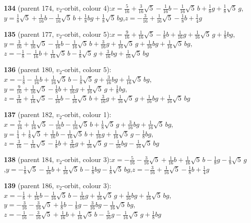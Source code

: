 \documentclass[10pt]{article}
\begin{document}
{\noindent\textbf{134} (parent 174, $v_2$-orbit, colour 4):\quad $x=\tfrac{5}{16}+\tfrac{3}{16}\sqrt5-\tfrac{1}{16}b-\tfrac{1}{16}\sqrt5\,b+\tfrac{1}{8}g+\tfrac{1}{8}\sqrt5\,g$,\quad $y=\tfrac{1}{8}\sqrt5+\tfrac{1}{16}b-\tfrac{1}{16}\sqrt5\,b+\tfrac{1}{8}bg+\tfrac{1}{8}\sqrt5\,bg$,\quad $z=-\tfrac{3}{16}+\tfrac{1}{16}\sqrt5-\tfrac{1}{8}b+\tfrac{1}{4}g$\par\smallskip
\noindent\textbf{135} (parent 177, $v_2$-orbit, colour 5):\quad $x=\tfrac{9}{16}+\tfrac{1}{16}\sqrt5-\tfrac{1}{8}b+\tfrac{1}{16}g+\tfrac{1}{16}\sqrt5\,g+\tfrac{1}{8}bg$,\quad $y=\tfrac{3}{16}+\tfrac{1}{16}\sqrt5-\tfrac{1}{16}b-\tfrac{1}{16}\sqrt5\,b+\tfrac{3}{16}g+\tfrac{1}{16}\sqrt5\,g+\tfrac{1}{16}bg+\tfrac{1}{16}\sqrt5\,bg$,\quad $z=-\tfrac{1}{8}-\tfrac{1}{16}b+\tfrac{1}{16}\sqrt5\,b-\tfrac{1}{8}\sqrt5\,g+\tfrac{3}{16}bg+\tfrac{1}{16}\sqrt5\,bg$\par\smallskip
\noindent\textbf{136} (parent 180, $v_2$-orbit, colour 5):\quad $x=-\tfrac{1}{8}-\tfrac{1}{16}b+\tfrac{1}{16}\sqrt5\,b-\tfrac{1}{8}\sqrt5\,g+\tfrac{3}{16}bg+\tfrac{1}{16}\sqrt5\,bg$,\quad $y=\tfrac{9}{16}+\tfrac{1}{16}\sqrt5-\tfrac{1}{8}b+\tfrac{1}{16}g+\tfrac{1}{16}\sqrt5\,g+\tfrac{1}{8}bg$,\quad $z=\tfrac{3}{16}+\tfrac{1}{16}\sqrt5-\tfrac{1}{16}b-\tfrac{1}{16}\sqrt5\,b+\tfrac{3}{16}g+\tfrac{1}{16}\sqrt5\,g+\tfrac{1}{16}bg+\tfrac{1}{16}\sqrt5\,bg$\par\smallskip
\noindent\textbf{137} (parent 182, $v_2$-orbit, colour 1):\quad $x=\tfrac{7}{16}+\tfrac{1}{16}\sqrt5-\tfrac{1}{16}b-\tfrac{1}{16}\sqrt5\,b+\tfrac{1}{8}\sqrt5\,g+\tfrac{3}{16}bg+\tfrac{1}{16}\sqrt5\,bg$,\quad $y=\tfrac{1}{4}+\tfrac{1}{8}\sqrt5+\tfrac{1}{16}b-\tfrac{1}{16}\sqrt5\,b+\tfrac{1}{16}g+\tfrac{1}{16}\sqrt5\,g-\tfrac{1}{8}bg$,\quad $z=\tfrac{3}{16}-\tfrac{1}{16}\sqrt5-\tfrac{1}{8}b+\tfrac{3}{16}g+\tfrac{1}{16}\sqrt5\,g-\tfrac{1}{16}bg-\tfrac{1}{16}\sqrt5\,bg$\par\smallskip
\noindent\textbf{138} (parent 184, $v_2$-orbit, colour 3):\quad $x=-\tfrac{5}{16}-\tfrac{3}{16}\sqrt5+\tfrac{1}{16}b+\tfrac{1}{16}\sqrt5\,b-\tfrac{1}{8}g-\tfrac{1}{8}\sqrt5\,g$,\quad $y=-\tfrac{1}{8}\sqrt5-\tfrac{1}{16}b+\tfrac{1}{16}\sqrt5\,b-\tfrac{1}{8}bg-\tfrac{1}{8}\sqrt5\,bg$,\quad $z=-\tfrac{3}{16}+\tfrac{1}{16}\sqrt5-\tfrac{1}{8}b+\tfrac{1}{4}g$\par\smallskip
\noindent\textbf{139} (parent 186, $v_2$-orbit, colour 3):\quad $x=-\tfrac{1}{8}+\tfrac{1}{16}b-\tfrac{1}{16}\sqrt5\,b-\tfrac{1}{16}g+\tfrac{1}{16}\sqrt5\,g+\tfrac{1}{16}bg+\tfrac{1}{16}\sqrt5\,bg$,\quad $y=-\tfrac{3}{16}-\tfrac{3}{16}\sqrt5+\tfrac{1}{8}b-\tfrac{1}{8}g-\tfrac{3}{16}bg-\tfrac{1}{16}\sqrt5\,bg$,\quad $z=-\tfrac{1}{16}-\tfrac{3}{16}\sqrt5+\tfrac{1}{16}b+\tfrac{1}{16}\sqrt5\,b-\tfrac{5}{16}g-\tfrac{1}{16}\sqrt5\,g+\tfrac{1}{8}bg$\par\smallskip
}
\end{document}
